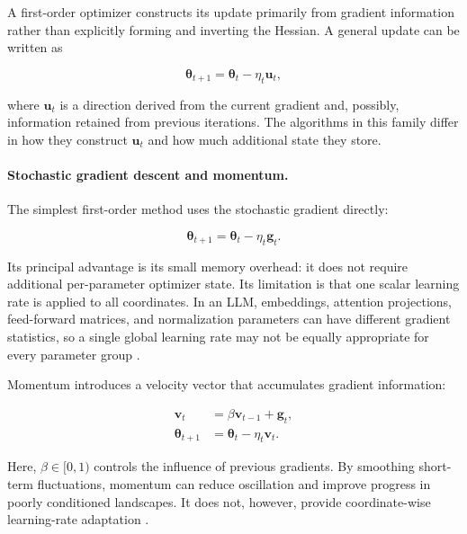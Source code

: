 A first-order optimizer constructs its update primarily from gradient
information rather than explicitly forming and inverting the Hessian.
A general update can be written as

\begin{equation}
    \boldsymbol{\theta}_{t+1}
    =
    \boldsymbol{\theta}_t-\eta_t\mathbf{u}_t,
    \label{eq:opt-general-update}
\end{equation}

where $\mathbf{u}_t$ is a direction derived from the current gradient and,
possibly, information retained from previous iterations. The algorithms
in this family differ in how they construct $\mathbf{u}_t$ and how much
additional state they store.

\paragraph{Stochastic gradient descent and momentum.}
The simplest first-order method uses the stochastic gradient directly:

\begin{equation}
    \boldsymbol{\theta}_{t+1}
    =
    \boldsymbol{\theta}_t-\eta_t\mathbf{g}_t.
    \label{eq:opt-sgd}
\end{equation}

Its principal advantage is its small memory overhead: it does not require
additional per-parameter optimizer state. Its limitation is that one
scalar learning rate is applied to all coordinates. In an LLM, embeddings,
attention projections, feed-forward matrices, and normalization parameters
can have different gradient statistics, so a single global learning rate
may not be equally appropriate for every parameter group
\parencite{Ranganath2026Navigating}.

Momentum introduces a velocity vector that accumulates gradient
information:

\begin{align}
    \mathbf{v}_t
    &=
    \beta\mathbf{v}_{t-1}+\mathbf{g}_t,
    \label{eq:opt-momentum-state}\\
    \boldsymbol{\theta}_{t+1}
    &=
    \boldsymbol{\theta}_t-\eta_t\mathbf{v}_t.
    \label{eq:opt-momentum-update}
\end{align}

Here, $\beta\in[0,1)$ controls the influence of previous gradients. By
smoothing short-term fluctuations, momentum can reduce oscillation and
improve progress in poorly conditioned landscapes. It does not, however,
provide coordinate-wise learning-rate adaptation
\parencite{Bottou2018Optimization,Ranganath2026Navigating}.

